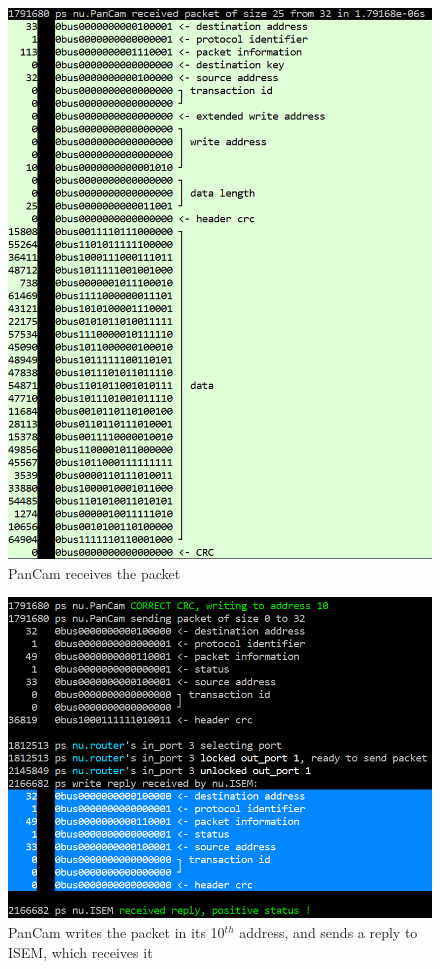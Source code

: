 \documentclass[12pt,a4paper]{article}
\begin{document}
\begin{figure}[h]
	\centering
    \includegraphics[scale = 0.5]{results/PanCam_receives.png}
    \caption{PanCam receives the packet}
\end{figure}
\smallbreak

\begin{figure}[h]
	\centering
    \includegraphics[scale = 0.5]{results/reply_packet_sent.png}
    \caption{PanCam writes the packet in its 10$^{th}$ address, and sends a reply to ISEM, which receives it}
\end{figure}
\pagebreak
\end{document}
